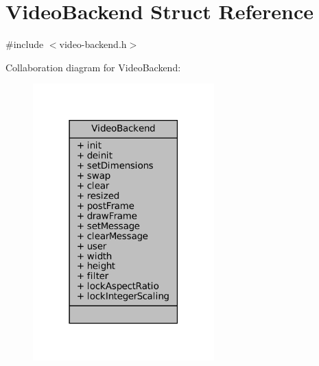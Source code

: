 \hypertarget{struct_video_backend}{}\section{Video\+Backend Struct Reference}
\label{struct_video_backend}


{\ttfamily \#include $<$video-\/backend.\+h$>$}



Collaboration diagram for Video\+Backend\+:
\nopagebreak
\begin{figure}[H]
\begin{center}
\leavevmode
\includegraphics[width=198pt]{struct_video_backend__coll__graph}
\end{center}
\end{figure}
